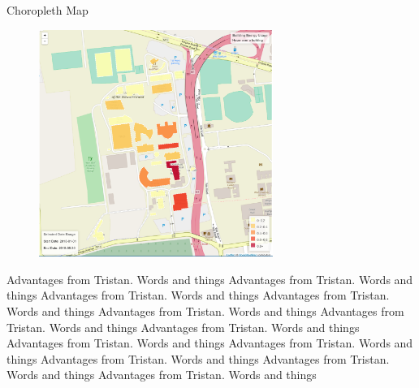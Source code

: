 \documentclass[8pt,xcolor={dvipsnames}]{beamer}
\begin{document}
{\begin{frame}{Choropleth Map}
\begin{figure}
	\begin{center}
		\includegraphics[width=0.68\textwidth, trim=0 0 0 0, clip]{ChoroplethMap}
	\end{center}
\end{figure}

Advantages from Tristan. Words and things
Advantages from Tristan. Words and things
Advantages from Tristan. Words and things
Advantages from Tristan. Words and things
Advantages from Tristan. Words and things
Advantages from Tristan. Words and things
Advantages from Tristan. Words and things
Advantages from Tristan. Words and things
Advantages from Tristan. Words and things
Advantages from Tristan. Words and things
Advantages from Tristan. Words and things
Advantages from Tristan. Words and things


\end{frame}}
\end{document}
